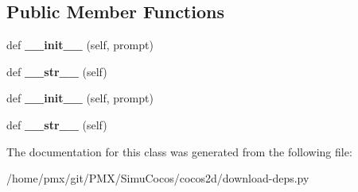 \subsection*{Public Member Functions}
\begin{DoxyCompactItemize}
\item 
\mbox{\label{classdownload-deps_1_1UnrecognizedFormat_afe5edb7d5ce6a8dd0cc1b57e382798b6}} 
def {\bfseries \+\_\+\+\_\+init\+\_\+\+\_\+} (self, prompt)
\item 
\mbox{\label{classdownload-deps_1_1UnrecognizedFormat_a0985aa811368b66b6af9491eccc5d253}} 
def {\bfseries \+\_\+\+\_\+str\+\_\+\+\_\+} (self)
\item 
\mbox{\label{classdownload-deps_1_1UnrecognizedFormat_afe5edb7d5ce6a8dd0cc1b57e382798b6}} 
def {\bfseries \+\_\+\+\_\+init\+\_\+\+\_\+} (self, prompt)
\item 
\mbox{\label{classdownload-deps_1_1UnrecognizedFormat_a0985aa811368b66b6af9491eccc5d253}} 
def {\bfseries \+\_\+\+\_\+str\+\_\+\+\_\+} (self)
\end{DoxyCompactItemize}


The documentation for this class was generated from the following file\+:\begin{DoxyCompactItemize}
\item 
/home/pmx/git/\+P\+M\+X/\+Simu\+Cocos/cocos2d/download-\/deps.\+py\end{DoxyCompactItemize}
